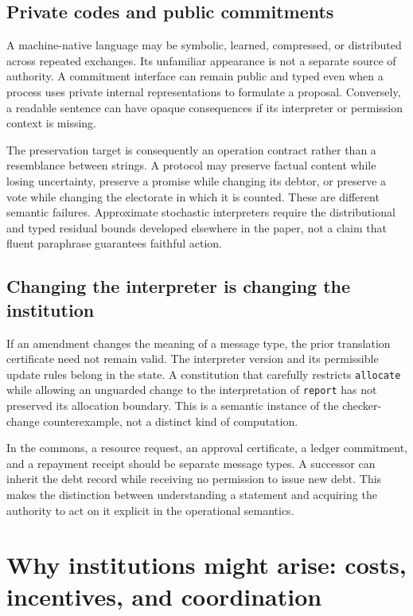 \documentclass[11pt,letterpaper]{article}
\theoremstyle{plain}
\theoremstyle{definition}
\theoremstyle{remark}
\newcommand{\code}[1]{\texttt{\small #1}}
\begin{document}
\subsection{Private codes and public commitments}
A machine-native language may be symbolic, learned, compressed, or distributed across repeated exchanges. Its unfamiliar appearance is not a separate source of authority. A commitment interface can remain public and typed even when a process uses private internal representations to formulate a proposal. Conversely, a readable sentence can have opaque consequences if its interpreter or permission context is missing.

The preservation target is consequently an operation contract rather than a resemblance between strings. A protocol may preserve factual content while losing uncertainty, preserve a promise while changing its debtor, or preserve a vote while changing the electorate in which it is counted. These are different semantic failures. Approximate stochastic interpreters require the distributional and typed residual bounds developed elsewhere in the paper, not a claim that fluent paraphrase guarantees faithful action.

\subsection{Changing the interpreter is changing the institution}
If an amendment changes the meaning of a message type, the prior translation certificate need not remain valid. The interpreter version and its permissible update rules belong in the state. A constitution that carefully restricts \code{allocate} while allowing an unguarded change to the interpretation of \code{report} has not preserved its allocation boundary. This is a semantic instance of the checker-change counterexample, not a distinct kind of computation.

In the commons, a resource request, an approval certificate, a ledger commitment, and a repayment receipt should be separate message types. A successor can inherit the debt record while receiving no permission to issue new debt. This makes the distinction between understanding a statement and acquiring the authority to act on it explicit in the operational semantics.

\section{Why institutions might arise: costs, incentives, and coordination}\label{sec:institution-formation}
\end{document}
